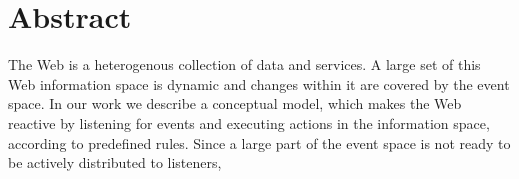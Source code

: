 \chapter*{Abstract}

The Web is a heterogenous collection of data and services.
A large set of this Web information space is dynamic and changes within it are covered by the event space.
In our work we describe a conceptual model, which makes the Web reactive by listening for events and executing actions in the information space, according to predefined rules.
Since a large part of the event space is not ready to be actively distributed to listeners,